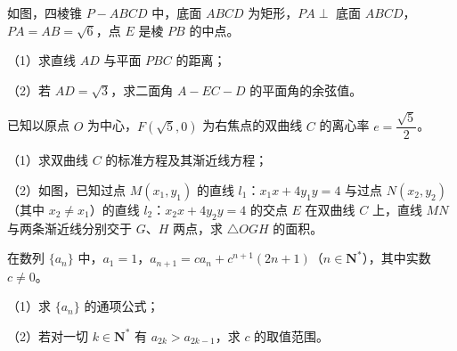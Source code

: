 \begingroup
\renewenvironment{question}{\Needspace{0.5\textheight}}{}
\begin{question}
如图，四棱锥 $P-ABCD$ 中，底面 $ABCD$ 为矩形，$PA\perp$ 底面 $ABCD$，$PA=AB=\sqrt6$，点 $E$ 是棱 $PB$ 的中点。

（1）求直线 $AD$ 与平面 $PBC$ 的距离；

（2）若 $AD=\sqrt3$，求二面角 $A-EC-D$ 的平面角的余弦值。
\nopagebreak[4]
\begin{center}\end{center}
\nopagebreak[4]
\Needspace{0.4\textheight}
\end{question}
\endgroup
\begingroup
\renewenvironment{question}{\Needspace{0.5\textheight}}{}
\begin{question}
已知以原点 $O$ 为中心，$F(\sqrt5,0)$ 为右焦点的双曲线 $C$ 的离心率 $e=\dfrac{\sqrt5}{2}$。

（1）求双曲线 $C$ 的标准方程及其渐近线方程；

（2）如图，已知过点 $M(x_1,y_1)$ 的直线 $l_1$：$x_1x+4y_1y=4$ 与过点 $N(x_2,y_2)$（其中 $x_2\neq x_1$）的直线 $l_2$：$x_2x+4y_2y=4$ 的交点 $E$ 在双曲线 $C$ 上，直线 $MN$ 与两条渐近线分别交于 $G$、$H$ 两点，求 $\triangle OGH$ 的面积。
\nopagebreak[4]
\begin{center}\end{center}
\nopagebreak[4]
\end{question}
\endgroup
\begin{question}
在数列 $\{a_n\}$ 中，$a_1=1$，$a_{n+1}=ca_n+c^{n+1}(2n+1)$（$n\in\mathbf N^*$），其中实数 $c\neq0$。

（1）求 $\{a_n\}$ 的通项公式；

（2）若对一切 $k\in\mathbf N^*$ 有 $a_{2k}>a_{2k-1}$，求 $c$ 的取值范围。

\end{question}